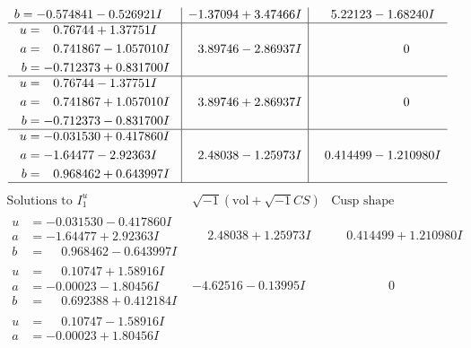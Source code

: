 \documentclass[1p]{elsarticle_modified}
\theoremstyle{definition}
\newcommand{\I}{\sqrt{-1}}
\begin{document}
$$\begin{array}{c|c|c}
\begin{aligned}
b &= -0.574841 - 0.526921 I\end{aligned}
 & -1.37094 + 3.47466 I & \phantom{-}5.22123 - 1.68240 I \\ \hline\begin{aligned}
u &= \phantom{-}0.76744 + 1.37751 I \\
a &= \phantom{-}0.741867 - 1.057010 I \\
b &= -0.712373 + 0.831700 I\end{aligned}
 & \phantom{-}3.89746 - 2.86937 I & \phantom{-0.000000 } 0 \\ \hline\begin{aligned}
u &= \phantom{-}0.76744 - 1.37751 I \\
a &= \phantom{-}0.741867 + 1.057010 I \\
b &= -0.712373 - 0.831700 I\end{aligned}
 & \phantom{-}3.89746 + 2.86937 I & \phantom{-0.000000 } 0 \\ \hline\begin{aligned}
u &= -0.031530 + 0.417860 I \\
a &= -1.64477 - 2.92363 I \\
b &= \phantom{-}0.968462 + 0.643997 I\end{aligned}
 & \phantom{-}2.48038 - 1.25973 I & \phantom{-}0.414499 - 1.210980 I\\
 \hline 
 \end{array}$$\newpage$$\begin{array}{c|c|c}  
\text{Solutions to }I^u_{1}& \I (\text{vol} + \sqrt{-1}CS) & \text{Cusp shape}\\
 \hline 
\begin{aligned}
u &= -0.031530 - 0.417860 I \\
a &= -1.64477 + 2.92363 I \\
b &= \phantom{-}0.968462 - 0.643997 I\end{aligned}
 & \phantom{-}2.48038 + 1.25973 I & \phantom{-}0.414499 + 1.210980 I \\ \hline\begin{aligned}
u &= \phantom{-}0.10747 + 1.58916 I \\
a &= -0.00023 - 1.80456 I \\
b &= \phantom{-}0.692388 + 0.412184 I\end{aligned}
 & -4.62516 - 0.13995 I & \phantom{-0.000000 } 0 \\ \hline\begin{aligned}
u &= \phantom{-}0.10747 - 1.58916 I \\
a &= -0.00023 + 1.80456 I \\

\end{aligned}
\end{array}$$
\end{document}
